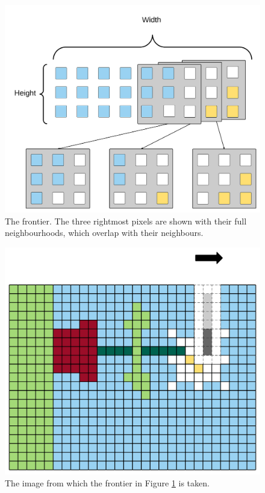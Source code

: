 \begin{figure}[h!]
    \centering
    \includegraphics[width=\linewidth]{img/frontier1_small.png}
    \caption[The frontier.]{The frontier. The three rightmost pixels are shown with their full neighbourhoods, which overlap with their neighbours.}
    \label{fig:frontier1}
\end{figure}

\begin{figure}[h!]
    \centering
    \includegraphics[width=\linewidth]{img/frontier2_small.png}
    \caption{The image from which the frontier in Figure \ref{fig:frontier1} is taken.}
    \label{fig:frontier2}
\end{figure}
